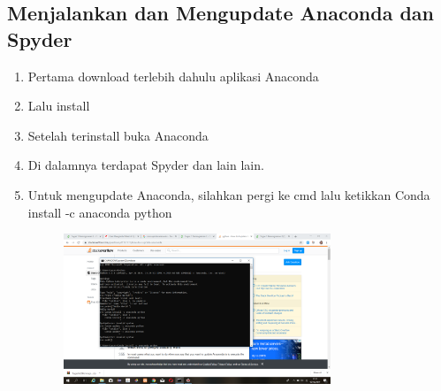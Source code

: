 \documentclass{article}
\begin{document}
\subsection{Menjalankan dan Mengupdate Anaconda dan Spyder}
\begin{enumerate}
    \item Pertama download terlebih dahulu aplikasi Anaconda
    \item Lalu install
    \item Setelah terinstall buka Anaconda
    \item Di dalamnya terdapat Spyder dan lain lain.
    \item Untuk mengupdate Anaconda, silahkan pergi ke cmd lalu ketikkan Conda install -c anaconda python
        \begin{figure}[h]
            \centerline{\includegraphics[width=8cm]{image/anacondaupdt.png}}
        \end{figure}
\end{enumerate}
\end{document}
